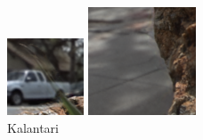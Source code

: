 \documentclass[10pt,twocolumn,letterpaper]{article}
\begin{document}
\begin{figure}[p]
\begin{multicols}{2}
\begin{multicols}{3}
            \includegraphics[width=\linewidth]{rock_crop_leaf/kalantari_05_05.png}\par\vspace{0.1in}\includegraphics[width=\linewidth]{rock_crop_walk/kalantari_05_05.png}\par\caption*{Kalantari \etal}

\end{multicols}
\end{multicols}
\end{figure}
\end{document}

